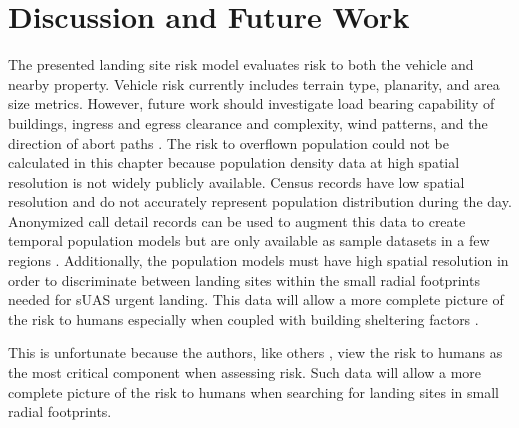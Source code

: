 \section{Discussion and Future Work}



The presented landing site risk model evaluates risk to both the vehicle and nearby property. Vehicle risk currently includes terrain type, planarity, and area size metrics. However, future work should investigate load bearing capability of buildings, ingress and egress clearance and complexity, wind patterns, and the direction of abort paths \cite{scherer_autonomous_2012}. The risk to overflown population could not be calculated in this chapter because population density data at high spatial resolution is not widely publicly available.  Census records have low spatial resolution and do not accurately represent population distribution during the day. Anonymized call detail records can be used to augment this data to create temporal population models but are only available as sample datasets in a few regions \cite{di_donato_evaluating_2017}. Additionally, the population models must have high spatial resolution in order to discriminate between landing sites within the small radial footprints needed for sUAS urgent landing. This data will allow a more complete picture of the risk to humans especially when coupled with building sheltering factors \cite{melnyk_third-party_2014-1}.

This is unfortunate because the authors, like others \cite{ancel_real-time_2017, di_donato_evaluating_2017}, view the risk to humans as the most critical component when assessing risk. Such data will allow a more complete picture of the risk to humans when searching for landing sites in small radial footprints. 

